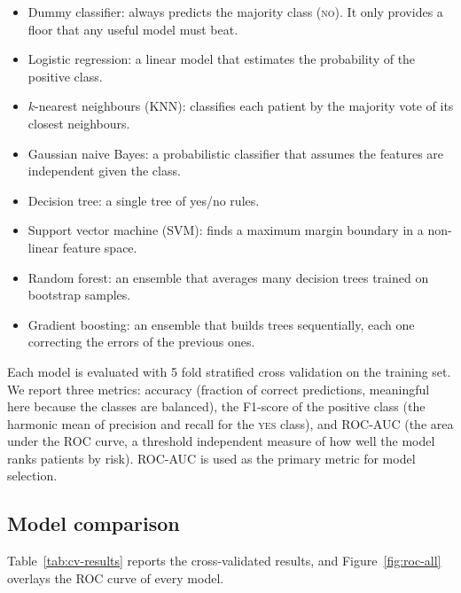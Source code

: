 \documentclass[11pt,a4paper]{article}
\begin{document}
\begin{itemize}
    \item Dummy classifier: always predicts the majority class (\textsc{no}). It only provides a floor that any useful model must beat.
    \item Logistic regression: a linear model that estimates the probability of the positive class.
    \item $k$-nearest neighbours (KNN): classifies each patient by the majority vote of its closest neighbours.
    \item Gaussian naive Bayes: a probabilistic classifier that assumes the features are independent given the class.
    \item Decision tree: a single tree of yes/no rules.
    \item Support vector machine (SVM): finds a maximum margin boundary in a non-linear feature space.
    \item Random forest: an ensemble that averages many decision trees trained on bootstrap samples.
    \item Gradient boosting: an ensemble that builds trees sequentially, each one correcting the errors of the previous ones.
\end{itemize}

Each model is evaluated with 5 fold stratified cross validation on the training
set. We report three metrics: accuracy (fraction of correct predictions,
meaningful here because the classes are balanced), the F1-score of the positive
class (the harmonic mean of precision and recall for the \textsc{yes} class), and
ROC-AUC (the area under the ROC curve, a threshold independent measure of how well
the model ranks patients by risk). ROC-AUC is used as the primary metric for model
selection.

\subsection{Model comparison}

Table~\ref{tab:cv-results} reports the cross-validated results, and
Figure~\ref{fig:roc-all} overlays the ROC curve of every model.
\end{document}
